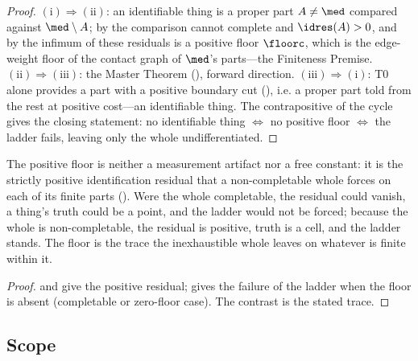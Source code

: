 \begin{proof}
$(\mathrm{i})\Rightarrow(\mathrm{ii})$: an identifiable thing is a proper part
$A\neq\med$ compared against $\med\setminus A$; by  the
comparison cannot complete and $\idres(A)>0$, and by  the
infimum of these residuals is a positive floor $\floorc$, which is the edge-weight
floor of the contact graph of $\med$'s parts---the Finiteness Premise.
$(\mathrm{ii})\Rightarrow(\mathrm{iii})$: the Master Theorem (),
forward direction. $(\mathrm{iii})\Rightarrow(\mathrm{i})$: T0 alone provides a
part with a positive boundary cut (), i.e. a proper part told from
the rest at positive cost---an identifiable thing. The contrapositive of the cycle
gives the closing statement: no identifiable thing $\iff$ no positive floor
$\iff$ the ladder fails, leaving only the whole undifferentiated.
\end{proof}

\begin{corollary}
\label{cor:trace}
The positive floor is neither a measurement artifact nor a free constant: it is
the strictly positive identification residual that a non-completable whole forces
on each of its finite parts \textup{(}\textup{)}. Were
the whole completable, the residual could vanish, a thing's truth could be a
point, and the ladder would not be forced; because the whole is non-completable,
the residual is positive, truth is a cell, and the ladder stands. The floor is the
trace the inexhaustible whole leaves on whatever is finite within it.
\end{corollary}

\begin{proof}
 and  give the positive
residual;  gives the failure of the ladder when the floor is
absent (completable or zero-floor case). The contrast is the stated trace.
\end{proof}

\subsection{Scope}

